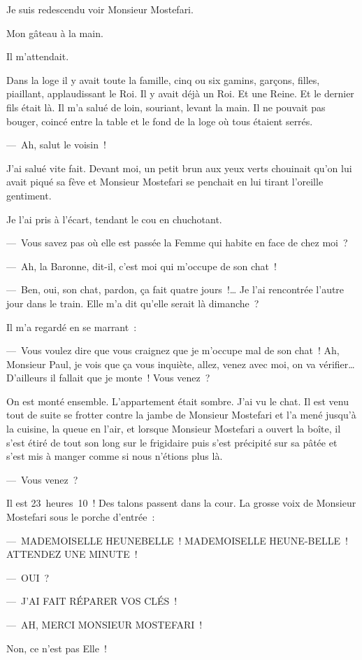 \documentclass[french,twoside]{book} %
\begin{document}
Je suis redescendu voir Monsieur Mostefari.\par
Mon gâteau à la main.\par
Il m’attendait.\par
Dans la loge il y avait toute la famille, cinq ou six gamins, garçons, filles, piaillant, applaudissant le Roi. Il y avait déjà un Roi. Et une Reine. Et le dernier fils était là. Il m’a salué de loin, souriant, levant la main. Il ne pouvait pas bouger, coincé entre la table et le fond de la loge où tous étaient serrés.\par
— Ah, salut le voisin !\par
J’ai salué vite fait. Devant moi, un petit brun aux yeux verts chouinait qu’on lui avait piqué sa fève et Monsieur Mostefari se penchait en lui tirant l’oreille gentiment.\par
Je l’ai pris à l’écart, tendant le cou en chuchotant.\par
— Vous savez pas où elle est passée la Femme qui habite en face de chez moi ?\par
— Ah, la Baronne, dit-il, c’est moi qui m’occupe de son chat !\par
— Ben, oui, son chat, pardon, ça fait quatre jours !… Je l’ai rencontrée l’autre jour dans le train. Elle m’a dit qu’elle serait là dimanche ?\par
Il m’a regardé en se marrant :\par
— Vous voulez dire que vous craignez que je m’occupe mal de son chat ! Ah, Monsieur Paul, je vois que ça vous inquiète, allez, venez avec moi, on va vérifier… D’ailleurs il fallait que je monte ! Vous venez ?\par
On est monté ensemble. L’appartement était sombre. J’ai vu le chat. Il est venu tout de suite se frotter contre la jambe de Monsieur Mostefari et l’a mené jusqu’à la cuisine, la queue en l’air, et lorsque Monsieur Mostefari a ouvert la boîte, il s’est étiré de tout son long sur le frigidaire puis s’est précipité sur sa pâtée et s’est mis à manger comme si nous n’étions plus là.\par
— Vous venez ?\par
\bigbreak
\noindent Il est 23 heures 10 ! Des talons passent dans la cour. La grosse voix de Monsieur Mostefari sous le porche d’entrée :\par
— MADEMOISELLE HEUNEBELLE ! MADEMOISELLE HEUNE-BELLE ! ATTENDEZ UNE MINUTE !\par
— OUI ?\par
— J’AI FAIT RÉPARER VOS CLÉS !\par
— AH, MERCI MONSIEUR MOSTEFARI !\par
Non, ce n’est pas Elle !
\end{document}
